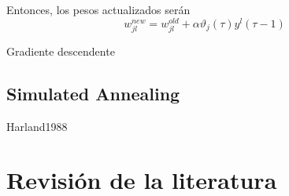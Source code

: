Entonces, los pesos actualizados serán $$ w_{jl}^{new} = w_{jl}^{old} + \alpha\vartheta_{j}(\tau)y^{l}(\tau - 1) $$
\begin{comment}
Error en el factor de escala. Véase también las contribuciones anteriroes al análisis del desvanecimiento del gradiente \cite{Hochreiter1997a, Bengio1994, Hochreiter1991}. Propagando el error de una unidad $u$ en el timpo $t$ hacia una unidad $v$ {\Huge for $q$ time steps}, el error escala como muestra la ecuación \ref{eq:scale_error}
\begin{eqnarray}
	\frac{\partial \vartheta_{v}(t - q)}{\partial \vartheta_{u}(t)}
	&=&
	\left\{
	\begin{array}{lr}
		f'_{v}(net_{v}(t - 1))w_{uv}&q=1\\
		\\
		f'_{v}(net_{v}(t - q))\sum^{n}_{l = 1}\frac{\partial \vartheta_{l}(t - q + 1)}{\partial \vartheta_{u}(t)}w_{lv}	&q > 1
	\end{array}
	\right.\label{eq:scale_error}
\end{eqnarray}
\end{comment}

\begin{imagen}
	\scalebox{1.0}{}
	\label{fig:vanishing}
	\caption{Gradiente descendente}
\end{imagen}

\subsection{Simulated Annealing}
Harland1988
\section{Revisión de la literatura}
